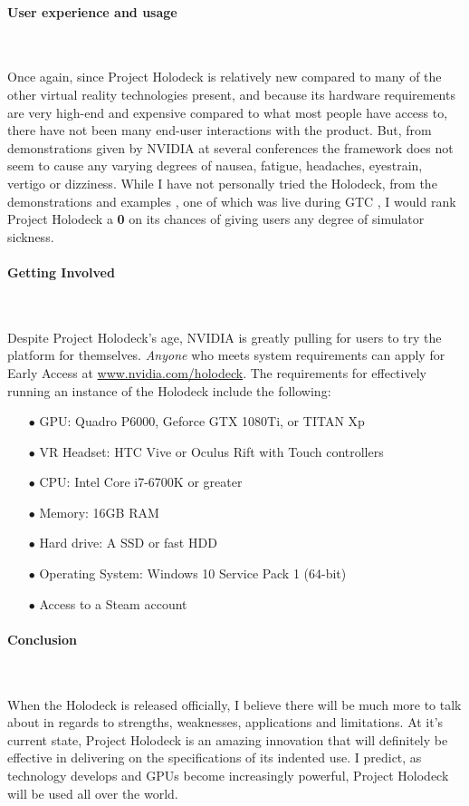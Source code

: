 \documentclass[11pt]{article}
\begin{document}
\paragraph{User experience and usage} ~ \par  
Once again, since Project Holodeck is relatively new compared to many of the other virtual reality technologies present, and because its hardware requirements are very high-end and expensive compared to what most people have access to, there have not been many end-user interactions with the product. But, from demonstrations given by NVIDIA at several conferences \cite{video1 - video3} the framework does not seem to cause any varying degrees of nausea, fatigue, headaches, eyestrain, vertigo or dizziness. While I have not personally tried the Holodeck, from the demonstrations and examples \cite{video1}, one of which was live during GTC \cite{video4}, I would rank Project Holodeck a \textbf{0} on its chances of giving users any degree of simulator sickness.

\paragraph{Getting Involved} ~ \par
Despite Project Holodeck's age, NVIDIA is greatly pulling for users to try the platform for themselves. \emph{Anyone} who meets system requirements can apply for Early Access at \url{www.nvidia.com/holodeck}. The requirements for effectively running an instance of the Holodeck include the following:
\begin{center}
\begin{enumerate}
\item[$\bullet$]GPU: Quadro P6000, Geforce GTX 1080Ti, or TITAN Xp
\item[$\bullet$]VR Headset: HTC Vive or Oculus Rift with Touch controllers
\item[$\bullet$]CPU: Intel Core i7-6700K or greater
\item[$\bullet$]Memory: 16GB RAM
\item[$\bullet$]Hard drive: A SSD or fast HDD
\item[$\bullet$]Operating System: Windows 10 Service Pack 1 (64-bit)
\item[$\bullet$]Access to a Steam account
\end{enumerate}
\end{center}

\paragraph{Conclusion} ~ \par 
When the Holodeck is released officially, I believe there will be much more to talk about in regards to strengths, weaknesses, applications and limitations. At it's current state, Project Holodeck is an amazing innovation that will definitely be effective in delivering on the specifications of its indented use. I predict, as technology develops and GPUs become increasingly powerful, Project Holodeck will be used all over the world.
\end{document}
